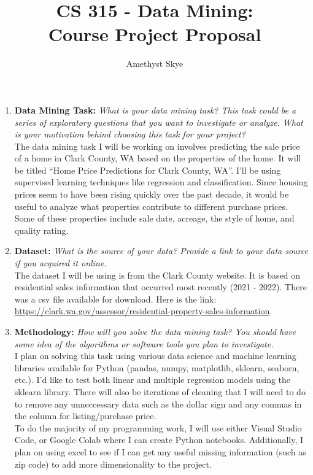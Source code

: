 \documentclass{article}
\title{\textbf{CS 315 - Data Mining: \\ Course Project Proposal}}
\author{Amethyst Skye}
\begin{document}
\maketitle
\normalsize
    \begin{enumerate}
        \item \textbf{Data Mining Task:} \textit{What is your data mining task? This task could be a series of exploratory questions that you want to investigate or analyze. What is your motivation behind choosing this task for your project?} \\

        The data mining task I will be working on involves predicting the sale price of a home in Clark County, WA based on the properties of the home. It will be titled ``Home Price Predictions for Clark County, WA''. I'll be using supervised learning techniques like regression and classification. Since housing prices seem to have been rising quickly over the past decade, it would be useful to analyze what properties contribute to different purchase prices. Some of these properties include sale date, acreage, the style of home, and quality rating. \\

        \item \textbf{Dataset:} \textit{What is the source of your data? Provide a link to your data source if you acquired it online.} \\

        The dataset I will be using is from the Clark County website. It is based on residential sales information that occurred most recently (2021 - 2022). There was a csv file available for download. Here is the link: \url{https://clark.wa.gov/assessor/residential-property-sales-information}. \\

        \item \textbf{Methodology:} \textit{How will you solve the data mining task? You should have some idea of the algorithms or software tools you plan to investigate.} \\

        I plan on solving this task using various data science and machine learning libraries available for Python (pandas, numpy, matplotlib, sklearn, seaborn, etc.). I'd like to test both linear and multiple regression models using the sklearn library. There will also be iterations of cleaning that I will need to do to remove any unneccessary data such as the dollar sign and any commas in the column for listing/purchase price. \\
        To do the majority of my programming work, I will use either Visual Studio Code, or Google Colab where I can create Python notebooks. Additionally, I plan on using excel to see if I can get any useful missing information (such as zip code) to add more dimensionality to the project. \\


\end{enumerate}
\end{document}
